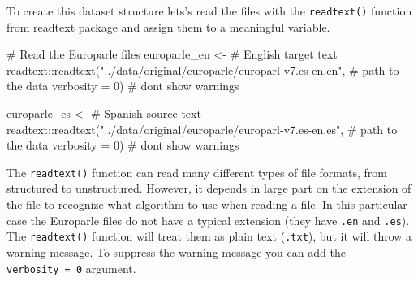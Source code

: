 \documentclass[
  letterpaper,
]{latex/krantz}
\newenvironment{Shaded}{\begin{snugshade}}{\end{snugshade}}
\newcommand{\AttributeTok}[1]{\textcolor[rgb]{0.40,0.45,0.13}{#1}}
\newcommand{\CommentTok}[1]{\textcolor[rgb]{0.37,0.37,0.37}{#1}}
\newcommand{\DecValTok}[1]{\textcolor[rgb]{0.68,0.00,0.00}{#1}}
\newcommand{\FunctionTok}[1]{\textcolor[rgb]{0.28,0.35,0.67}{#1}}
\newcommand{\NormalTok}[1]{\textcolor[rgb]{0.00,0.23,0.31}{#1}}
\newcommand{\OtherTok}[1]{\textcolor[rgb]{0.00,0.23,0.31}{#1}}
\newcommand{\SpecialCharTok}[1]{\textcolor[rgb]{0.37,0.37,0.37}{#1}}
\newcommand{\StringTok}[1]{\textcolor[rgb]{0.13,0.47,0.30}{#1}}
\begin{document}
To create this dataset structure lets's read the files with the
\texttt{readtext()} function from readtext package and assign them to a
meaningful variable.

\begin{Shaded}
\begin{Highlighting}[]
\CommentTok{\# Read the Europarle files}
\NormalTok{europarle\_en }\OtherTok{\textless{}{-}}  \CommentTok{\# English target text}
\NormalTok{  readtext}\SpecialCharTok{::}\FunctionTok{readtext}\NormalTok{(}\StringTok{"../data/original/europarle/europarl{-}v7.es{-}en.en"}\NormalTok{, }\CommentTok{\# path to the data}
                     \AttributeTok{verbosity =} \DecValTok{0}\NormalTok{) }\CommentTok{\# don\textquotesingle{}t show warnings}

\NormalTok{europarle\_es }\OtherTok{\textless{}{-}} \CommentTok{\# Spanish source text}
\NormalTok{  readtext}\SpecialCharTok{::}\FunctionTok{readtext}\NormalTok{(}\StringTok{"../data/original/europarle/europarl{-}v7.es{-}en.es"}\NormalTok{, }\CommentTok{\# path to the data}
                     \AttributeTok{verbosity =} \DecValTok{0}\NormalTok{) }\CommentTok{\# don\textquotesingle{}t show warnings}
\end{Highlighting}
\end{Shaded}

\begin{tcolorbox}[enhanced jigsaw, toprule=.15mm, bottomtitle=1mm, coltitle=black, title=\textcolor{quarto-callout-warning-color}{\faExclamationTriangle}\hspace{0.5em}{Tip}, left=2mm, colframe=quarto-callout-warning-color-frame, bottomrule=.15mm, colbacktitle=quarto-callout-warning-color!10!white, leftrule=.75mm, colback=white, titlerule=0mm, breakable, toptitle=1mm, opacityback=0, arc=.35mm, rightrule=.15mm, opacitybacktitle=0.6]

The \texttt{readtext()} function can read many different types of file
formats, from structured to unstructured. However, it depends in large
part on the extension of the file to recognize what algorithm to use
when reading a file. In this particular case the Europarle files do not
have a typical extension (they have \texttt{.en} and \texttt{.es}). The
\texttt{readtext()} function will treat them as plain text
(\texttt{.txt}), but it will throw a warning message. To suppress the
warning message you can add the \texttt{verbosity\ =\ 0} argument.

\end{tcolorbox}
\end{document}
